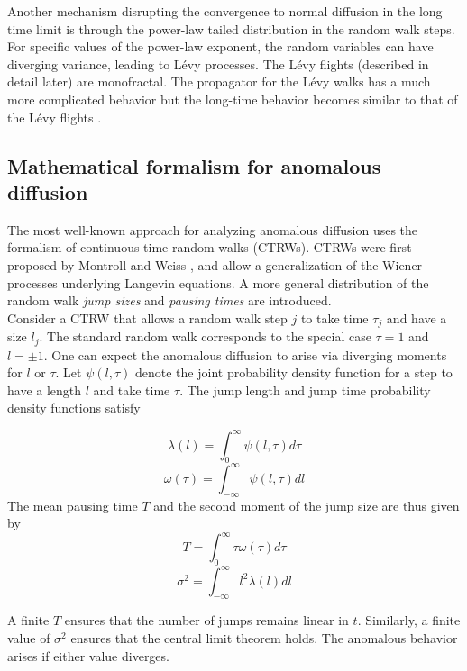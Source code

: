 \documentclass[12pt]{report}
\begin{document}
\begin{justify}
Another mechanism disrupting the convergence to normal diffusion in the long time limit is through the power-law tailed distribution in the random walk steps. For specific values of the power-law exponent, the random variables can have diverging variance, leading to L\'evy processes. The L\'evy flights (described in detail later) are monofractal. The propagator for the L\'evy walks has a much more complicated behavior but the long-time behavior becomes similar to that of the L\'evy flights \cite{levyFW, levyFW1}.

\subsection{Mathematical formalism for anomalous diffusion}

The most well-known approach for analyzing anomalous diffusion uses the formalism of continuous time random walks (CTRWs). CTRWs were first proposed by Montroll and Weiss \cite{CTRW, AsympSoltoCTRW}, and allow a generalization of the Wiener processes underlying Langevin equations. A more general distribution of the random walk \textit{jump sizes} and \textit{pausing times}  are introduced. \\

Consider a CTRW that allows a random walk step $j$ to take time $\tau_j$ and have a size $l_j$. The standard random walk corresponds to the special case $\tau = 1$ and $l = \pm 1$. One can expect the anomalous diffusion to arise via diverging moments for $l$ or $\tau$. Let $\psi(l, \tau)$ denote the joint probability density function for a step to have a length $l$ and take time $\tau$. The jump length and jump time probability density functions satisfy

\begin{equation}
\lambda(l) = \int_0^\infty  \psi (l, \tau)d\tau
\end{equation}
\begin{equation}
\omega(\tau) = \int_{-\infty}^\infty  \psi (l, \tau)dl
\end{equation}
The mean pausing time $T$ and the second moment of the jump size are thus given by
\begin{equation}
T = \int_0^\infty \tau \omega(\tau)d\tau
\end{equation}
\begin{equation}
\sigma^2 = \int_{-\infty}^\infty l^2 \lambda(l) dl
\end{equation}

A finite $T$ ensures that the number of jumps remains linear in $t$. Similarly, a finite value of $\sigma^2$ ensures that the central limit theorem holds. The anomalous behavior arises if either value diverges.


\end{justify}
\end{document}
